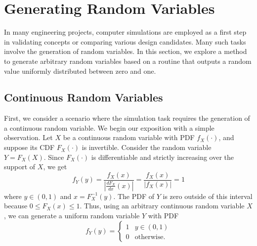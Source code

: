 \section{Generating Random Variables}

In many engineering projects, computer simulations are employed as a first step in validating concepts or comparing various design candidates.
Many such tasks involve the generation of random variables.
In this section, we explore a method to generate arbitrary random variables based on a routine that outputs a random value uniformly distributed between zero and one.

\subsection{Continuous Random Variables}

First, we consider a scenario where the simulation task requires the generation of a continuous random variable.
We begin our exposition with a simple observation.
Let $X$ be a continuous random variable with PDF $f_X (\cdot)$, and suppose its CDF $F_X(\cdot)$ is invertible.
Consider the random variable $Y = F_X(X)$.
Since $F_X (\cdot)$ is differentiable and strictly increasing over the support of $X$, we get
\begin{equation*}
f_Y (y) = \frac{f_X (x)}{\left| \frac{d F_X}{dx} (x) \right|}
= \frac{f_X (x)}{| f_X (x) |} = 1
\end{equation*}
where $y \in (0, 1)$ and $x = F_X^{-1} (y)$.
The PDF of $Y$ is zero outside of this interval because $0 \leq F_X (x) \leq 1$.
Thus, using an arbitrary continuous random variable $X$, we can generate a uniform random variable $Y$ with PDF
\begin{equation*}
f_Y(y) = \begin{cases} 1 & y \in (0,1) \\
0 & \text{otherwise} . \end{cases}
\end{equation*}


